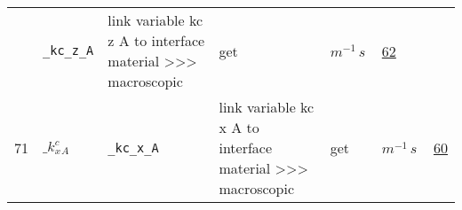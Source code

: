 \begin{longtable}{|p{1cm}|p{2.5cm}|p{4.5cm}|p{8cm}|p{3.0cm}|p{3cm}|p{1cm}|}
             & \verb|_kc_z_A|
             & link variable kc z A to interface material >>> macroscopic
             & \begin{lay}get \end{lay}
             & $ m^{-1} \,s \, $
             &                 \hyperlink{"e:62"}{ 62 }
                 \\
            71
             & \hypertarget{"v:71"}{ $ {{\_k^c_x}}{_{A}} $}
             & \verb|_kc_x_A|
             & link variable kc x A to interface material >>> macroscopic
             & \begin{lay}get \end{lay}
             & $ m^{-1} \,s \, $
             &                 \hyperlink{"e:60"}{ 60 }
                 \\
    \end{longtable}